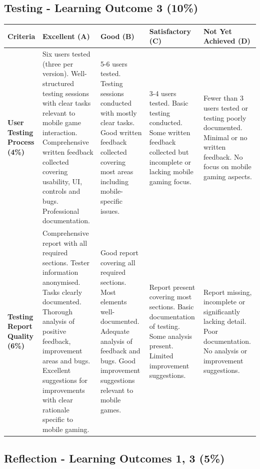 \documentclass{article}
\begin{document}
\begin{landscape}
\begin{tabular}{|p{5cm}|p{4cm}|p{4cm}|p{4cm}|p{4cm}|}
\end{tabular}

\subsection*{Testing - Learning Outcome 3 (10\%)}

\begin{tabular}{|p{5cm}|p{4cm}|p{4cm}|p{4cm}|p{4cm}|}
\hline
\textbf{Criteria} & \textbf{Excellent (A)} & \textbf{Good (B)} & \textbf{Satisfactory (C)} & \textbf{Not Yet Achieved (D)} \\ \hline

\textbf{User Testing Process (4\%)} & 
Six users tested (three per version). Well-structured testing sessions with clear tasks relevant to mobile game interaction. Comprehensive written feedback collected covering usability, UI, controls and bugs. Professional documentation. & 
5-6 users tested. Testing sessions conducted with mostly clear tasks. Good written feedback collected covering most areas including mobile-specific issues. & 
3-4 users tested. Basic testing conducted. Some written feedback collected but incomplete or lacking mobile gaming focus. & 
Fewer than 3 users tested or testing poorly documented. Minimal or no written feedback. No focus on mobile gaming aspects. \\ \hline

\textbf{Testing Report Quality (6\%)} & 
Comprehensive report with all required sections. Tester information anonymised. Tasks clearly documented. Thorough analysis of positive feedback, improvement areas and bugs. Excellent suggestions for improvements with clear rationale specific to mobile gaming. & 
Good report covering all required sections. Most elements well-documented. Adequate analysis of feedback and bugs. Good improvement suggestions relevant to mobile games. & 
Report present covering most sections. Basic documentation of testing. Some analysis present. Limited improvement suggestions. & 
Report missing, incomplete or significantly lacking detail. Poor documentation. No analysis or improvement suggestions. \\ \hline

\end{tabular}

\subsection*{Reflection - Learning Outcomes 1, 3 (5\%)}


\end{landscape}
\end{document}

